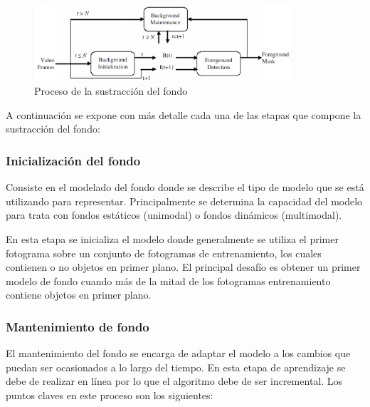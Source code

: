 \begin{figure}[ht]
\centering
\includegraphics[width=0.85\textwidth]{img/chapters/estado-del-arte/background-subtraction-process.png}
\caption{\label{fig:background-subtraction-process}Proceso de la sustracción del fondo \cite{BOUWMANS201431}}
\end{figure}

A continuación se expone con más detalle cada una de las etapas que compone la sustracción del fondo:

\subsubsection*{Inicialización del fondo}
\label{subsubsec:inicializacion-del-fondo}

Consiste en el modelado del fondo donde se describe el tipo de modelo que se está utilizando para representar. Principalmente se determina la capacidad del modelo para trata con fondos estáticos (unimodal) o fondos dinámicos (multimodal).

En esta etapa se inicializa el modelo donde generalmente se utiliza el primer fotograma sobre un conjunto de fotogramas de entrenamiento, los cuales contienen o no objetos en primer plano. El principal desafío es obtener un primer modelo de fondo cuando más de la mitad de los fotogramas entrenamiento contiene objetos en primer plano.


\subsubsection*{Mantenimiento de fondo}
\label{subsubsec:mantenimiento-fondo}

El mantenimiento del fondo se encarga de adaptar el modelo a los cambios que puedan ser ocasionados a lo largo del tiempo. En esta etapa de aprendizaje se debe de realizar en línea por lo que el algoritmo debe de ser incremental. Los puntos claves en este proceso son los siguientes:

